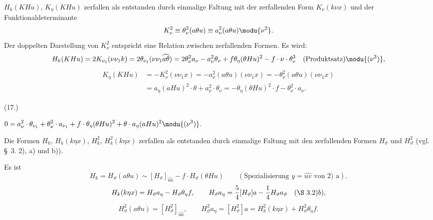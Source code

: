 $H_k(KHu)$, $K_\eta(KHu)$ zerfallen als entstanden durch einmalige Faltung mit der zerfallenden Form $K_\nu(k\nu x)$ und der Funktionaldeterminante
\[
K_\nu^2\equiv\theta_\nu^2(a\theta u)\equiv a_\nu^2(a\theta u)\modu{\nu^2}.
\]
Der doppelten Darstellung von $K_\nu^2$ entspricht eine Relation zwischen zerfallenden Formen. Es wird:
\[
H_k(KHu)=2K_{\nu_1}(\nu\nu_1k)=2\theta_{\nu_1}(\nu\nu_1\widehat{a\theta})
=2\theta_\nu^2a_\nu-a_\nu^2\theta_\nu+f\theta_\eta(\theta Hu)^2-f\cdot \nu\cdot\theta_\nu^3\quad(\text{Produktsatz})\modu{(\nu^3)},
\]
\[
\begin{aligned}
K_\eta(KHu)&=-K_\nu^2(\nu\nu_1x)=-a_\nu^2(a\theta u)(\nu\nu_1x)=-\theta_\nu^2(a\theta u)(\nu\nu_1x)\\
&=a_\eta(aHu)^2\cdot\theta+a_\nu^2\cdot\theta_\nu
=-\theta_\eta(\theta Hu)^2\cdot f-\theta_\nu^2\cdot a_\nu.
\end{aligned}
\]
\par\smallskip\noindent
\begin{minipage}[c]{4.8em}
\centering (17.)\srcfnmark{*)}
\end{minipage}%
\begin{minipage}[c]{\dimexpr\linewidth-4.8em\relax}
\centering
\(\displaystyle
0=a_\nu^2\cdot\theta_{\nu_1}+\theta_\nu^2\cdot a_{\nu_1}+f\cdot\theta_\eta(\theta Hu)^2+\theta\cdot a_\eta(aHu)^2\modu{(\nu^3)}.
\)
\end{minipage}
\par\smallskip
{}
Die Formen $H_k$, $H_k(k\eta x)$, $H_k^2$, $H_k^2(k\eta x)$ zerfallen als entstanden durch einmalige Faltung mit den zerfallenden Formen $H_\vartheta$ und $H_\vartheta^2$ (vgl. \S\ 3. 2), a) und b)).

Es ist
\[
H_k=H_\vartheta(a\theta u)\sim[H_\vartheta]_{\widehat{ua}}-f\cdot H_\vartheta(\theta Hu)\qquad(\text{Spezialisierung }y=\widehat{uv}\text{ von 2) a}).
\]
\[
H_k(k\eta x)=H_\vartheta a_\eta-H_\vartheta\theta_\eta f,
\qquad
H_\vartheta a_\eta=\frac54[H_\vartheta]a-\frac14H_\vartheta a_\vartheta
\quad(\S\ 3. 2)b),
\]
\[
H_\vartheta^2(a\theta u)=[H_\vartheta^2]_{\widehat{ua}},
\qquad
H_\vartheta^2a_\eta=[H_\vartheta^2]a=H_k^2(k\eta x)+H_\vartheta^2\theta_\eta f.
\]

